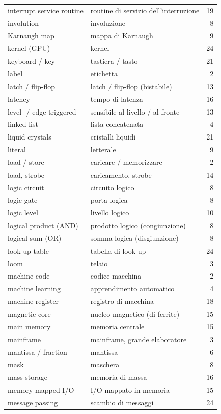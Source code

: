 {\begin{longtable}{@{}p{}p{}r@{}}
interrupt service routine & routine di servizio dell'interruzione & 19\\
involution & involuzione & 8\\
Karnaugh map & mappa di Karnaugh & 9\\
kernel (GPU) & kernel & 24\\
keyboard / key & tastiera / tasto & 21\\
label & etichetta & 2\\
latch / flip-flop & latch / flip-flop (bistabile) & 13\\
latency & tempo di latenza & 16\\
level- / edge-triggered & sensibile al livello / al fronte & 13\\
linked list & lista concatenata & 4\\
liquid crystals & cristalli liquidi & 21\\
literal & letterale & 9\\
load / store & caricare / memorizzare & 2\\
load, strobe & caricamento, strobe & 14\\
logic circuit & circuito logico & 8\\
logic gate & porta logica & 8\\
logic level & livello logico & 10\\
logical product (AND) & prodotto logico (congiunzione) & 8\\
logical sum (OR) & somma logica (disgiunzione) & 8\\
look-up table & tabella di look-up & 24\\
loom & telaio & 3\\
machine code & codice macchina & 2\\
machine learning & apprendimento automatico & 4\\
machine register & registro di macchina & 18\\
magnetic core & nucleo magnetico (di ferrite) & 15\\
main memory & memoria centrale & 15\\
mainframe & mainframe, grande elaboratore & 3\\
mantissa / fraction & mantissa & 6\\
mask & maschera & 8\\
mass storage & memoria di massa & 16\\
memory-mapped I/O & I/O mappato in memoria & 15\\
message passing & scambio di messaggi & 24\\

\end{longtable}}
